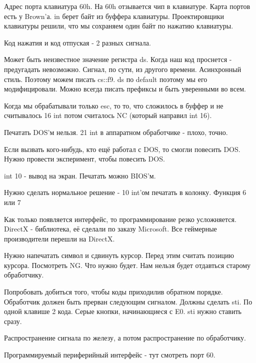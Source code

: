 Адрес порта клавиатура 60h. На 60h отзывается чип в клавиатуре. Карта портов есть у Brown'а. 
in берет байт из буффера клавиатуры. Проектировщики клавиатуры решили, что мы сохраняем один байт по нажатию клавиатуры. 

Код нажатия и код отпуская - 2 разных сигнала.

Может быть неизвестное значение регистра ds. Когда наш код проснется - предугадать невозможно. Сигнал, по сути, из другого времени. Асинхронный стиль. Поэтому можем писать cs::f9.
ds по default поэтому мы его модифицировали. Можно всегда писать префиксы и быть уверенными во всем. 

Когда мы обрабатывали только esc, то то, что сложилось в буффер и не считывалось 16 int потом считалось NC (который направил int 16). 

Печатать DOS'м нельзя. 21 int в аппаратном обработчике - плохо, точно. 

Если вызвать кого-нибудь, кто ещё работал с DOS, то смогли повесить DOS. Нужно провести эксперимент, чтобы повесить DOS.

int 10 - вывод на экран. Печатать можно BIOS'м. 

\begin{hw}Нужно сделать нормальное решение - 10 int'ом печатать в колонку. Функция 6 или 7\end{hw}

\begin{off}Как только появляется интерфейс, то программирование резко усложняется. DirectX - библиотека, её сделали по заказу Microsoft. Все геймерные производители перешли на DirectX.  
\end{off}

Нужно напечатать символ и сдвинуть курсор. Перед этим считать позицию курсора. Посмотреть NG.
Что нужно будет. Нам нельзя будет отдавться старому обработчику.

Попробовать добиться того, чтобы коды приходилив обратном порядке. Обработчик должен быть прерван следующим сигналом. Должны сделать sti. По одной клавише 2 кода. Серые кнопки, начинающиеся с E0.     
sti нужно ставить сразу. 

Распространение сигнала по железу, а потом распространение по обработчику. 
 
Программируемый периферийный интерфейс - тут смотреть порт 60. 
